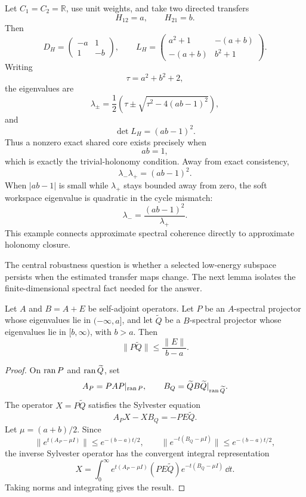 Let \(C_1=C_2=\mathbb R\), use unit weights, and take two directed transfers
\[
H_{12}=a,
\qquad
H_{21}=b.
\]
Then
\[
D_H
=
\begin{pmatrix}
-a&1\\
1&-b
\end{pmatrix},
\qquad
L_H
=
\begin{pmatrix}
a^2+1&-(a+b)\\
-(a+b)&b^2+1
\end{pmatrix}.
\]
Writing
\[
\tau=a^2+b^2+2,
\]
the eigenvalues are
\[
\lambda_\pm
=
\frac{1}{2}
\left(
\tau\pm\sqrt{\tau^2-4(ab-1)^2}
\right),
\]
and
\[
\det L_H=(ab-1)^2.
\]
Thus a nonzero exact shared core exists precisely when
\[
ab=1,
\]
which is exactly the trivial-holonomy condition. Away from exact consistency,
\[
\lambda_-\lambda_+=(ab-1)^2.
\]
When \(|ab-1|\) is small while \(\lambda_+\) stays bounded away from zero, the
soft workspace eigenvalue is quadratic in the cycle mismatch:
\[
\lambda_-
=
\frac{(ab-1)^2}{\lambda_+}.
\]
This example connects approximate spectral coherence directly to approximate
holonomy closure.


The central robustness question is whether a selected low-energy subspace
persists when the estimated transfer maps change. The next lemma isolates the
finite-dimensional spectral fact needed for the answer.

\begin{lemma}\label{lem:separated-subspaces}
Let \(A\) and \(B=A+E\) be self-adjoint operators. Let \(P\) be an
\(A\)-spectral projector whose eigenvalues lie in \(( -\infty,a]\), and let
\(\widetilde Q\) be a \(B\)-spectral projector whose eigenvalues lie in
\([b,\infty)\), with \(b>a\). Then
\[
\|P\widetilde Q\|
\leq
\frac{\|E\|}{b-a}.
\]
\end{lemma}

\begin{proof}
On \(\operatorname{ran} P\) and \(\operatorname{ran}\widetilde Q\), set
\[
A_P=PAP|_{\operatorname{ran} P},
\qquad
B_Q=\widetilde QB\widetilde Q|_{\operatorname{ran}\widetilde Q}.
\]
The operator \(X=P\widetilde Q\) satisfies the Sylvester equation
\[
A_PX-XB_Q=-PE\widetilde Q.
\]
Let \(\mu=(a+b)/2\). Since
\[
\|e^{t(A_P-\mu I)}\|\leq e^{-(b-a)t/2},
\qquad
\|e^{-t(B_Q-\mu I)}\|\leq e^{-(b-a)t/2},
\]
the inverse Sylvester operator has the convergent integral representation
\[
X
=
\int_0^\infty
 e^{t(A_P-\mu I)}
 (PE\widetilde Q)
 e^{-t(B_Q-\mu I)}\,\dd t.
\]
Taking norms and integrating gives the result.
\end{proof}

